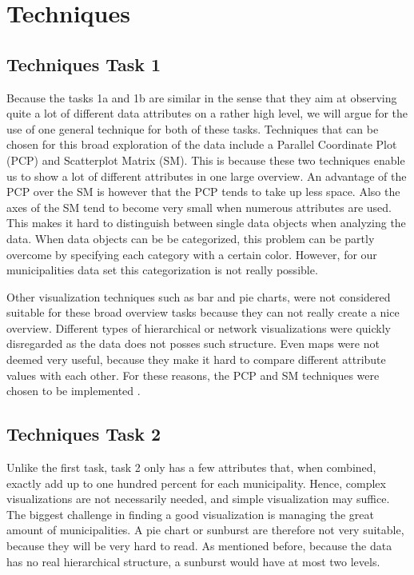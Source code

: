 \section{Techniques}\label{sec:techniques}

\subsection{Techniques Task 1}\label{sec:techniques1}
Because the tasks 1a and 1b are similar in the sense that they aim at observing quite a lot of different data attributes on a rather high level, we will argue for the use of one general technique for both of these tasks. Techniques that can be chosen for this broad exploration of the data include a Parallel Coordinate Plot (PCP) and Scatterplot Matrix (SM). This is because these two techniques enable us to show a lot of different attributes in one large overview. An advantage of the PCP over the SM is however that the PCP tends to take up less space. Also the axes of the SM tend to become very small when numerous attributes are used. This makes it hard to distinguish between single data objects when analyzing the data. When data objects can be be categorized, this problem can be partly overcome by specifying each category with a certain color. However, for our municipalities data set this categorization is not really possible.

Other visualization techniques such as bar and pie charts, were not considered suitable for these broad overview tasks because they can not really create a nice overview. Different types of hierarchical or network visualizations were quickly disregarded as the data does not posses such structure. Even maps were not deemed very useful, because they make it hard to compare different attribute values with each other. For these reasons, the PCP and SM techniques were chosen to be implemented \cite{D3pcp}\cite{D3sm}.



\subsection{Techniques Task 2}\label{sec:techniques2}
Unlike the first task, task 2 only has a few attributes that, when combined, exactly add up to one hundred percent for each municipality. Hence, complex visualizations are not necessarily needed, and simple visualization may suffice. The biggest challenge in finding a good visualization is managing the great amount of municipalities. A pie chart or sunburst are therefore not very suitable, because they will be very hard to read. As mentioned before, because the data has no real hierarchical structure, a sunburst would have at most two levels.

